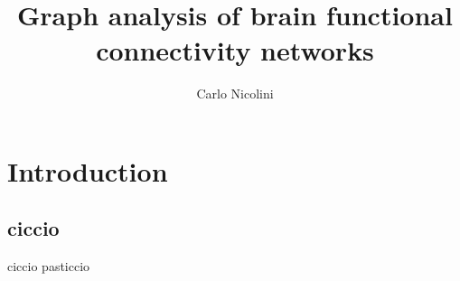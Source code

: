 

\linespread{1.12} %



\title{Graph analysis of brain functional connectivity networks}
\author{Carlo Nicolini}


\maketitle

\chapter{Introduction}\label{chap:introduction}
\section{ciccio}
ciccio pasticcio
